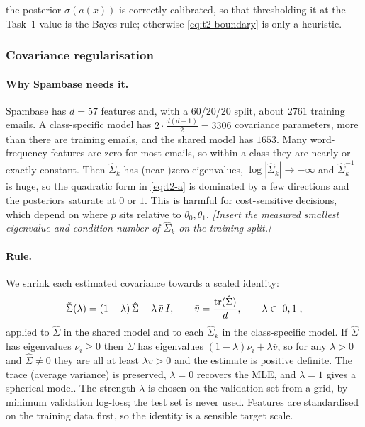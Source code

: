 \begin{assumptions}
the posterior $\sigma(a(x))$ is correctly calibrated, so that thresholding it at the
Task~1 value is the Bayes rule; otherwise \eqref{eq:t2-boundary} is only a heuristic.
\end{assumptions}

\subsubsection{Covariance regularisation}\label{sec:t2-reg}
\paragraph{Why Spambase needs it.}
Spambase has $d=57$ features and, with a 60/20/20 split, about $2761$ training emails. A class-specific
model has $2\cdot\frac{d(d+1)}2=3306$ covariance parameters, more than there are training emails, and
the shared model has $1653$. Many word-frequency features are zero for most emails, so within a class
they are nearly or exactly constant. Then $\hat\Sigma_k$ has (near-)zero eigenvalues,
$\log|\hat\Sigma_k|\to-\infty$ and $\hat\Sigma_k^{-1}$ is huge, so the quadratic form in \eqref{eq:t2-a}
is dominated by a few directions and the posteriors saturate at $0$ or $1$. This is harmful for
cost-sensitive decisions, which depend on where $p$ sits relative to $\theta_0,\theta_1$.
\emph{[Insert the measured smallest eigenvalue and condition number of $\hat\Sigma_k$ on the training
split.]}

\paragraph{Rule.}
We shrink each estimated covariance towards a scaled identity:
\begin{equation}
  \tilde\Sigma(\lambda)=(1-\lambda)\,\hat\Sigma+\lambda\,\bar v\,I,\qquad
  \bar v=\frac{\operatorname{tr}(\hat\Sigma)}{d},\qquad\lambda\in[0,1],
  \label{eq:t2-shrink}
\end{equation}
applied to $\hat\Sigma$ in the shared model and to each $\hat\Sigma_k$ in the class-specific model. If
$\hat\Sigma$ has eigenvalues $\nu_i\ge0$ then $\tilde\Sigma$ has eigenvalues $(1-\lambda)\nu_i+\lambda\bar v$,
so for any $\lambda>0$ and $\hat\Sigma\ne0$ they are all at least $\lambda\bar v>0$ and the estimate is
positive definite. The trace (average variance) is preserved, $\lambda=0$ recovers the MLE, and
$\lambda=1$ gives a spherical model. The strength $\lambda$ is chosen on the validation set from a grid,
by minimum validation log-loss; the test set is never used. Features are standardised on the
training data first, so the identity is a sensible target scale.

